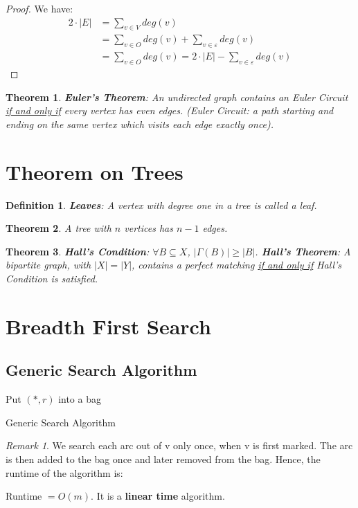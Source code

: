 \documentclass[11pt, a4paper, oneside]{book}
\theoremstyle{theoremdd}
\newtheorem*{definition}{Definition}
\newtheorem{theorem}{Theorem}[chapter]
\theoremstyle{remark}
\newtheorem*{remark}{Remark}
\begin{document}
\begin{proof}
We have: 
\begin{align*}
2\cdot |E| & = \sum_{v\in V} deg(v) \\&
             = \sum_{v\in O} deg(v) + \sum_{v\in \varepsilon} deg(v) \\&
             = \sum_{v\in O}deg(v) = 2\cdot |E| - \sum_{v\in \varepsilon} deg(v)
\end{align*}
\end{proof}

\begin{theorem}
\textbf{Euler's Theorem}: An undirected graph contains an Euler Circuit \underline{if and only if} every vertex has even edges. (Euler Circuit: a path starting and ending on the same vertex which visits each edge exactly once).
\end{theorem}

\section*{Theorem on Trees}
\begin{definition}
\textbf{Leaves}: A vertex with degree one in a tree is called a leaf. 
\end{definition}

\begin{theorem}
A tree with $n$ vertices has $n-1$ edges.
\end{theorem}

\begin{theorem}
\textbf{Hall's Condition}: $\forall B \subseteq X$, $|\Gamma (B)| \geq |B|$. \textbf{Hall's Theorem}: A bipartite graph, with $|X|=|Y|$, contains a perfect matching \underline{if and only if} Hall's Condition is satisfied. 
\end{theorem}

\section*{Breadth First Search}
\subsection*{Generic Search Algorithm}
\begin{algorithm}[H]
\SetAlgoLined
{}
Put $(*,r)$ into a bag\;
\caption{Generic Search Algorithm}
\end{algorithm}
\begin{remark}
We search each arc out of v only once, when v is first marked. The arc is then added to the bag once and later removed from the bag. Hence, the runtime of the algorithm is: 
\begin{center}
Runtime $=O(m)$. It is a \textbf{linear time} algorithm. 
\end{center}
\end{remark}
\end{document}
